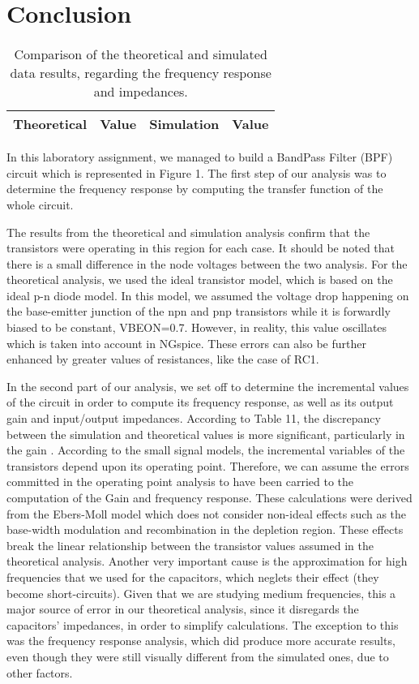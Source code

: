 \section{Conclusion}
\label{sec:conclusion}
\begin{table}[!h]
  \centering
  \begin{tabular}{c c c c}
    \hline    
    {\bf Theoretical} & {\bf Value} & {\bf Simulation} & {\bf Value}\\ \hline
     
  \end{tabular}
  \caption{Comparison of the theoretical and simulated data results, regarding the frequency response and impedances.}
  \label{tab:comp}
\end{table}

In this laboratory assignment, we managed to build a BandPass Filter (BPF) circuit which is represented in Figure 1. The first step of our analysis was to determine the frequency response by computing the transfer function of the whole circuit.

 The results from the theoretical and simulation analysis confirm that the transistors were operating in this region for each case. It should be noted that there is a small difference in the node voltages between the two analysis. For the theoretical analysis, we used the ideal transistor model, which is based on the ideal p-n diode model. In this model, we assumed the voltage drop happening on the base-emitter junction of the npn and pnp transistors while it is forwardly biased to be constant, VBEON=0.7. However, in reality, this value oscillates which is taken into account in NGspice. These errors can also be further enhanced by greater values of resistances, like the case of RC1.

In the second part of our analysis, we set off to determine the incremental values of the circuit in order to compute its frequency response, as well as its output gain and input/output impedances. According to Table 11, the discrepancy between the simulation and theoretical values is more significant, particularly in the gain . According to the small signal models, the incremental variables of the transistors depend upon its operating point. Therefore, we can assume the errors committed in the operating point analysis to have been carried to the computation of the Gain and frequency response. These calculations were derived from the Ebers-Moll model which does not consider non-ideal effects such as the base-width modulation and recombination in the depletion region. These effects break the linear relationship between the transistor values assumed in the theoretical analysis. Another very important cause is the approximation for high frequencies that we used for the capacitors, which neglets their effect (they become short-circuits). Given that we are studying medium frequencies, this a major source of error in our theoretical analysis, since it disregards the capacitors' impedances, in order to simplify calculations. The exception to this was the frequency response analysis, which did produce more accurate results, even though they were still visually different from the simulated ones, due to other factors.

